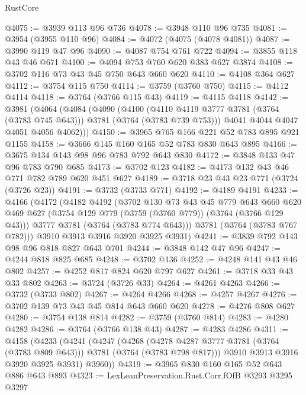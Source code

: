 \begin{lexlean}{RustCore}
\begin{coremodule}
@4075 := @3939 @113 @96 @736
@4078 := @3948 @110 @96 @735
@4081 := @3954 (@3955 @110 @96)
@4084 := @4072 (@4075 (@4078 @4081))
@4087 := @3990 @119 @47 @96
@4090 := @4087 @754 @761 @722
@4094 := @3855 @118 @43 @46 @671
@4100 := @4094 @753 @760 @620 @383 @627 @3874
@4108 := @3702 @116 @73 @43 @45 @750 @643 @660 @620
@4110 := @4108 @364 @627
@4112 := @3754 @115 @750
@4114 := @3759 (@3760 @750)
@4115 := @4112 @4114
@4118 := @3764 (@3766 @115 @43)
@4119 := @4115 @4118
@4142 := @3981
    (@4064
      (@4084
        (@4090
          (@4100
            (@4110 @4119 @3777 @3781 (@3764 (@3783 @745 @643)))
            @3781
            (@3764 (@3783 @739 @753)))
          @4041
          @4044
          @4047
          @4051
          @4056
          @4062)))
@4150 := @3965 @765 @166 @221 @52 @783 @895 @921 @1155
@4158 := @3666 @145 @160 @165 @52 @783 @830 @643 @895
@4166 := @3675 @134 @143 @98 @96 @783 @792 @643 @830
@4172 := @3848 @133 @47 @96 @783 @790 @685
@4173 := @3702 @123
@4182 := @4173 @132 @43 @46 @771 @782 @789 @620 @451 @627
@4189 := @3718 @23 @43 @23 @771 (@3724 (@3726 @23))
@4191 := @3732 (@3733 @771)
@4192 := @4189 @4191
@4233 := @4166
    (@4172
      (@4182
        @4192
        (@3702
          @130
          @73
          @43
          @45
          @779
          @643
          @660
          @620
          @469
          @627
          (@3754 @129 @779 (@3759 (@3760 @779)) (@3764 (@3766 @129 @43)))
          @3777
          @3781
          (@3764 (@3783 @774 @643)))
        @3781
        (@3764 (@3783 @767 @782)))
      @3910
      @3913
      @3916
      @3920
      @3925
      @3931)
@4241 := @3839 @792 @143 @98 @96 @818 @827 @643 @701
@4244 := @3848 @142 @47 @96
@4247 := @4244 @818 @825 @685
@4248 := @3702 @136
@4252 := @4248 @141 @43 @46 @802
@4257 := @4252 @817 @824 @620 @797 @627
@4261 := @3718 @33 @43 @33 @802
@4263 := @3724 (@3726 @33)
@4264 := @4261 @4263
@4266 := @3732 (@3733 @802)
@4267 := @4264 @4266
@4268 := @4257 @4267
@4276 := @3702 @139 @73 @43 @45 @814 @643 @660 @620
@4278 := @4276 @808 @627
@4280 := @3754 @138 @814
@4282 := @3759 (@3760 @814)
@4283 := @4280 @4282
@4286 := @3764 (@3766 @138 @43)
@4287 := @4283 @4286
@4311 := @4158
    (@4233
      (@4241
        (@4247
          (@4268
            (@4278 @4287 @3777 @3781 (@3764 (@3783 @809 @643)))
            @3781
            (@3764 (@3783 @798 @817)))
          @3910
          @3913
          @3916
          @3920
          @3925
          @3931)
        @3960))
@4319 := @3965 @830 @160 @165 @52 @643 @886 @643 @893
@4323 := LexLeanPreservation.Rust.Corr.fOfB @3293 @3295 @3297

\end{coremodule}
\end{lexlean}

